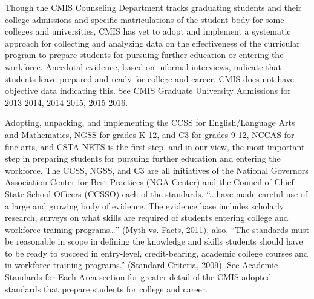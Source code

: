 \begin{findings}
Though the CMIS Counseling Department tracks graduating students and their college admissions and specific matriculations of the student body for some colleges and universities, CMIS has yet to adopt and implement a systematic approach for collecting and analyzing data on the effectiveness of the curricular program to prepare students for pursuing further education or entering the workforce. Anecdotal evidence, based on informal interviews,  indicate that students leave prepared and ready for college and career, CMIS does not have objective data indicating this. See 
CMIS Graduate University Admissions for \href{https://docs.google.com/a/cmis.ac.th/document/d/1M7BROvkK3R77OdA72Ki5pvfYoB2icgE0Q3hEeFLE5T0/edit?usp=sharing}{2013-2014}, \href{https://docs.google.com/a/cmis.ac.th/document/d/1zw64gEZHVkJ_9B9-Gg3vSRzOMfmSo9-WBJLWPOm0DXI/edit?usp=sharing}{2014-2015}, \href{https://docs.google.com/a/cmis.ac.th/document/d/1HZgueYnVPvIi645E2ZaxqHpwtzVN9zyEyP8XcOibPyY/edit?usp=sharing}{2015-2016}. 


Adopting, unpacking, and implementing the CCSS for English/Language Arts and Mathematics, NGSS for grades K-12,  and C3 for grades 9-12, NCCAS for fine arts, and CSTA
NETS is the first step, and in our view, the most important step in preparing students for pursuing further education and entering the workforce. The CCSS, NGSS, and C3 are all initiatives of the  National Governors Association Center for Best Practices (NGA Center) and the Council of Chief State School Officers (CCSSO) each of the standards, “...have made careful use of a large and growing body of evidence. The evidence base includes scholarly research, surveys on what skills are required of students entering college and workforce training programs…” (Myth vs. Facts, 2011), also, “The standards must be reasonable in scope in defining the knowledge and skills students should have to be ready to succeed in entry-level, credit-bearing, academic college courses and in workforce training programs.” (\href{https://drive.google.com/drive/search?q=standards\%20criteria}{Standard Criteria}, 2009). See Academic Standards for Each Area section for greater detail of the CMIS adopted standards that prepare students for college and career. 



\end{findings}
